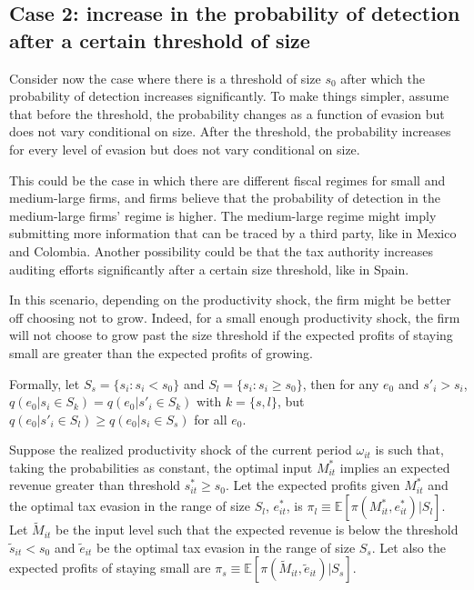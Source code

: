 \documentclass[
  12pt]{article}
\theoremstyle{definition}
\theoremstyle{remark}
\begin{document}
\hypertarget{case-2-increase-in-the-probability-of-detection-after-a-certain-threshold-of-size}{%
\subsection{Case 2: increase in the probability of detection after a
certain threshold of
size}\label{case-2-increase-in-the-probability-of-detection-after-a-certain-threshold-of-size}}

Consider now the case where there is a threshold of size \(s_0\) after
which the probability of detection increases significantly. To make
things simpler, assume that before the threshold, the probability
changes as a function of evasion but does not vary conditional on size.
After the threshold, the probability increases for every level of
evasion but does not vary conditional on size.

This could be the case in which there are different fiscal regimes for
small and medium-large firms, and firms believe that the probability of
detection in the medium-large firms' regime is higher. The medium-large
regime might imply submitting more information that can be traced by a
third party, like in Mexico and Colombia. Another possibility could be
that the tax authority increases auditing efforts significantly after a
certain size threshold, like in Spain.

In this scenario, depending on the productivity shock, the firm might be
better off choosing not to grow. Indeed, for a small enough productivity
shock, the firm will not choose to grow past the size threshold if the
expected profits of staying small are greater than the expected profits
of growing.

Formally, let \(S_{s} = \{s_i : s_{i} < s_0 \}\) and
\(S_{l} = \{s_i : s_{i} \ge s_0 \}\), then for any \(e_0\) and
\(s'_i>s_i\), \(q(e_0|s_i \in S_k)=q(e_0|s'_i \in S_k)\) with
\(k=\{s,l\}\), but \(q(e_0|s'_i \in S_l)\ge q(e_0|s_i \in S_s)\) for all
\(e_0\).

Suppose the realized productivity shock of the current period
\(\omega_{it}\) is such that, taking the probabilities as constant, the
optimal input \(M^*_{it}\) implies an expected revenue greater than
threshold \(s^*_{it}\ge s_0\). Let the expected profits given
\(M^*_{it}\) and the optimal tax evasion in the range of size \(S_l\),
\(e^*_{it}\), is \(\pi_l\equiv\mathbb{E}[\pi(M^*_{it}, e^*_{it})|S_l]\).
Let \(\tilde{M}_{it}\) be the input level such that the expected revenue
is below the threshold \(\tilde{s}_{it}<s_0\) and \(\tilde{e}_{it}\) be
the optimal tax evasion in the range of size \(S_s\). Let also the
expected profits of staying small are
\(\pi_s\equiv\mathbb{E}[\pi(\tilde{M}_{it},\tilde{e}_{it})|S_s]\).
\end{document}
